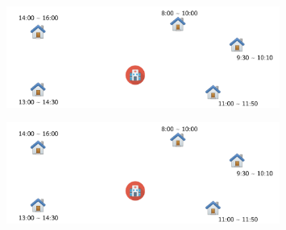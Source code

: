 \documentclass{beamer}
\begin{document}
{   \only<+> {
      \begin{figure}[H]
         \includegraphics[width=0.8\textwidth, page=5]{fig/routing-example}%
      \end{figure}
   }

   \only<+> {
      \begin{figure}[H]
         \includegraphics[width=0.8\textwidth, page=6]{fig/routing-example}%
      \end{figure}
   }
}

%
%
\end{document}
